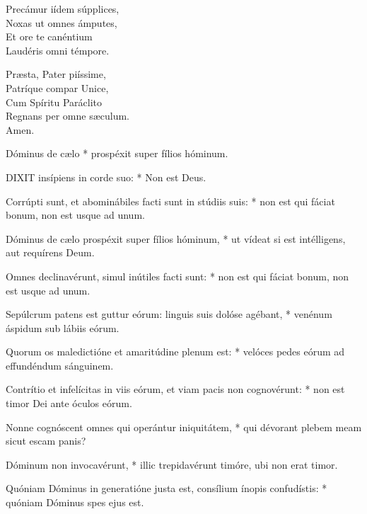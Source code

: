 Precámur iídem súpplices,\\
Noxas ut omnes ámputes,\\
Et ore te canéntium\\
Laudéris omni témpore.

Præsta, Pater piíssime,\\
Patríque compar Unice,\\
Cum Spíritu Paráclito\\
Regnans per omne sæculum.\\
Amen.


 Dóminus de cælo * prospéxit super fílios hóminum.




\lettrine[lines=2]{D}{IXIT} insípiens in corde suo: * Non est Deus.

Corrúpti sunt, et abominábiles facti sunt in stúdiis suis: * non est qui fáciat bonum, non est usque ad unum.

Dóminus de cælo prospéxit super fílios hóminum, * ut vídeat si est intélligens, aut requírens Deum.

Omnes declinavérunt, simul inútiles facti sunt: * non est qui fáciat bonum, non est usque ad unum.

Sepúlcrum patens est guttur eórum: linguis suis dolóse agébant, * venénum áspidum sub lábiis eórum.

Quorum os maledictióne et amaritúdine plenum est: * velóces pedes eórum ad effundéndum sánguinem.

Contrítio et infelícitas in viis eórum, et viam pacis non cognovérunt: * non est timor Dei ante óculos eórum.

Nonne cognóscent omnes qui operántur iniquitátem, * qui dévorant plebem meam sicut escam panis?

Dóminum non invocavérunt, * illic trepidavérunt timóre, ubi non erat timor.

Quóniam Dóminus in generatióne justa est, consílium ínopis confudístis: * quóniam Dóminus spes ejus est.

